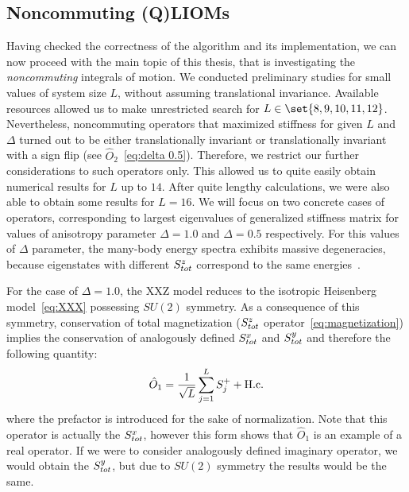 \subsection{Noncommuting (Q)LIOMs}
Having checked the correctness of the algorithm and its implementation, we can now proceed with the
main topic of this thesis, that is investigating the \textit{noncommuting} integrals of motion. 
We conducted preliminary studies for small values of system size \(L\), without assuming
translational invariance. Available resources allowed us to make unrestricted search for
 \(L \in \set{8,9,10,11,12}\). Nevertheless, noncommuting operators that maximized stiffness for given 
 \(L\) and \(\Delta \) turned out to be either translationally invariant or translationally invariant with
 a sign flip (see \(\hat{O}_2\)~\eqref{eq:delta 0.5}). Therefore, we restrict our further 
considerations to such operators only. This allowed us to quite easily obtain numerical
results for \(L\) up to \(14\). After quite lengthy calculations, we were also able
to obtain some results for \(L=16\).
We will focus on two concrete cases of operators, corresponding
to largest eigenvalues of generalized stiffness matrix for values of anisotropy
parameter \(\Delta=1.0\) and \(\Delta=0.5\) respectively. For this values of
\( \Delta \) parameter, the many-body energy spectra exhibits massive degeneracies, because
eigenstates with different \(S^{z}_{tot}\) correspond to the same energies~\autocite{Fagotti2014,Mierzejewski2021}.

For the case of \(\Delta=1.0\), the XXZ model reduces to the isotropic Heisenberg model~\eqref{eq:XXX}
possessing \(SU(2)\) symmetry.
As a consequence of this symmetry, conservation of total magnetization 
(\(S^{z}_{tot}\) operator~\eqref{eq:magnetization}) implies the conservation of analogously defined \(S^{x}_{tot}\)
and \(S^{y}_{tot}\) and therefore the following quantity:
\begin{equation}
    \hat{O}_{1} =  \frac{1}{\sqrt{L}}\sum_{j=1}^{L} S^{+}_{j} + \text{H.c.}
    \label{eq:delta 1.0}
\end{equation}
where the prefactor is introduced for the sake of normalization. Note that
this operator is actually the \(S^{x}_{tot}\), however this form shows that \(\hat{O}_1\) 
is an example of a real operator. If we were to consider analogously defined imaginary operator,
we would obtain the \(S^{y}_{tot}\), but due to \(SU(2)\) symmetry the results would be the same.


